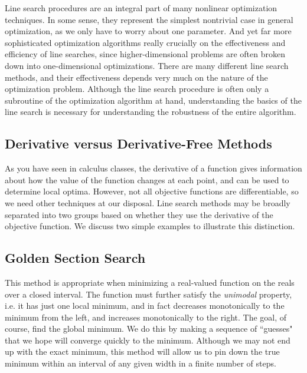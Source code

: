 
Line search procedures are an integral part of many nonlinear optimization techniques. 
In some sense, they represent the simplest nontrivial case in general optimization, as 
we only have to worry about one parameter. And yet far more sophisticated optimization 
algorithms really crucially on the effectiveness and efficiency of line searches, since 
higher-dimensional problems are often broken down into one-dimensional optimizations. 
There are many different line search methods, and their effectiveness depends very much 
on the nature of the optimization problem. Although the line search procedure is often 
only a subroutine of the optimization algorithm at hand, understanding the basics of 
the line search is necessary for understanding the robustness of the entire algorithm.

\subsection*{Derivative versus Derivative-Free Methods}
As you have seen in calculus classes, the derivative of a function gives information 
about how the value of the function changes at each point, and can be used to determine 
local optima. However, not all objective functions are differentiable, so we need other 
techniques at our disposal. Line search methods may be broadly separated into two groups 
based on whether they use the derivative of the objective function. We discuss two 
simple examples to illustrate this distinction.

\subsection*{Golden Section Search}
This method is appropriate when minimizing a real-valued function on the reals over a 
closed interval. The function must further satisfy the \emph{unimodal} property, i.e. 
it has just one local minimum, and in fact decreases monotonically to the minimum from 
the left, and increases monotonically to the right. The goal, of course, find the 
global minimum. We do this by making a sequence of ``guesses" that we hope will converge 
quickly to the minimum. Although we may not end up with the exact minimum, this method 
will allow us to pin down the true minimum within an interval of any given width in a 
finite number of steps.

